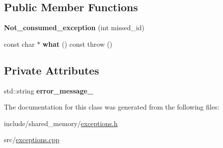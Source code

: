 \subsection*{Public Member Functions}
\begin{DoxyCompactItemize}
\item 
{\bfseries Not\+\_\+consumed\+\_\+exception} (int missed\+\_\+id)\hypertarget{classshared__memory_1_1Not__consumed__exception_a10634d3dd5cb672f549205540fdd26a7}{}\label{classshared__memory_1_1Not__consumed__exception_a10634d3dd5cb672f549205540fdd26a7}

\item 
const char $\ast$ {\bfseries what} () const   throw ()\hypertarget{classshared__memory_1_1Not__consumed__exception_af7f6a6855a793da4e40e4f6b4c451e36}{}\label{classshared__memory_1_1Not__consumed__exception_af7f6a6855a793da4e40e4f6b4c451e36}

\end{DoxyCompactItemize}
\subsection*{Private Attributes}
\begin{DoxyCompactItemize}
\item 
std\+::string {\bfseries error\+\_\+message\+\_\+}\hypertarget{classshared__memory_1_1Not__consumed__exception_af35506334fcf23eae0ccfe101a2fdb9c}{}\label{classshared__memory_1_1Not__consumed__exception_af35506334fcf23eae0ccfe101a2fdb9c}

\end{DoxyCompactItemize}


The documentation for this class was generated from the following files\+:\begin{DoxyCompactItemize}
\item 
include/shared\+\_\+memory/\hyperlink{exceptions_8h}{exceptions.\+h}\item 
src/\hyperlink{exceptions_8cpp}{exceptions.\+cpp}\end{DoxyCompactItemize}
